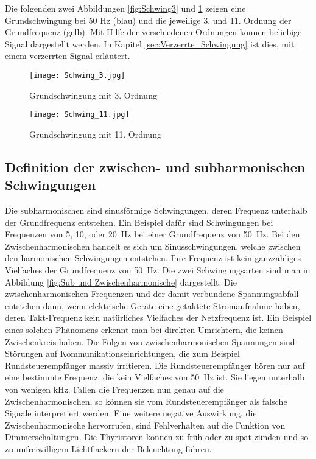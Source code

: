 Die folgenden zwei Abbildungen \ref{fig:Schwing3} und \ref{fig:Schwing11} zeigen eine Grundschwingung bei 50 Hz (blau) und die jeweilige 3. und 11. Ordnung der Grundfrequenz (gelb). Mit Hilfe der verschiedenen Ordnungen können beliebige Signal dargestellt werden. In Kapitel \ref{sec:Verzerrte_Schwingung} ist dies, mit einem verzerrten Signal erläutert. 

\begin{figure}[ht!]
	\begin{minipage}[t]{0.49\textwidth}
		\centering
		\texttt{[image: Schwing\_3.jpg]}	
		\caption{Grundschwingung mit 3. Ordnung \cite{Oberwellen}}\label{fig:Schwing3}
	\end{minipage}	
	\begin{minipage}[t]{0.49\textwidth}	
		\centering	
		\texttt{[image: Schwing\_11.jpg]}	
		\caption{Grundschwingung mit 11. Ordnung \cite{Oberwellen}}\label{fig:Schwing11}
	\end{minipage}
\end{figure}

\subsection{Definition der zwischen- und subharmonischen Schwingungen}

Die subharmonischen sind sinusförmige Schwingungen, deren Frequenz unterhalb der Grundfrequenz entstehen. Ein Beispiel dafür sind Schwingungen bei Frequenzen von 5, 10, oder \SI{20}{Hz} bei einer Grundfrequenz von \SI{50}{Hz}. Bei den Zwischenharmonischen handelt es sich um Sinusschwingungen, welche zwischen den harmonischen Schwingungen entstehen. Ihre Frequenz ist kein ganzzahliges Vielfaches der Grundfrequenz von \SI{50}{Hz}. Die zwei Schwingungsarten sind man in Abbildung \ref{fig:Sub und Zwischenharmonische} dargestellt. Die zwischenharmonischen Frequenzen und der damit verbundene Spannungsabfall entstehen dann, wenn elektrische Geräte eine getaktete Stromaufnahme haben, deren Takt-Frequenz kein natürliches Vielfaches der Netzfrequenz ist. Ein Beispiel eines solchen Phänomens erkennt man bei direkten Umrichtern, die keinen Zwischenkreis haben. Die Folgen von zwischenharmonischen Spannungen sind Störungen auf Kommunikationseinrichtungen, die zum Beispiel Rundsteuerempfänger massiv irritieren. Die Rundsteuerempfänger hören nur auf eine bestimmte Frequenz, die kein Vielfaches von \SI{50}{Hz} ist. Sie liegen unterhalb von wenigen kHz. Fallen die Frequenzen nun genau auf die Zwischenharmonischen, so können sie vom Rundsteuerempfänger als falsche Signale interpretiert werden. Eine weitere negative Auswirkung, die Zwischenharmonische hervorrufen, sind Fehlverhalten auf die Funktion von Dimmerschaltungen. Die Thyristoren können zu früh oder zu spät zünden und so zu unfreiwilligem Lichtflackern der Beleuchtung führen. 

